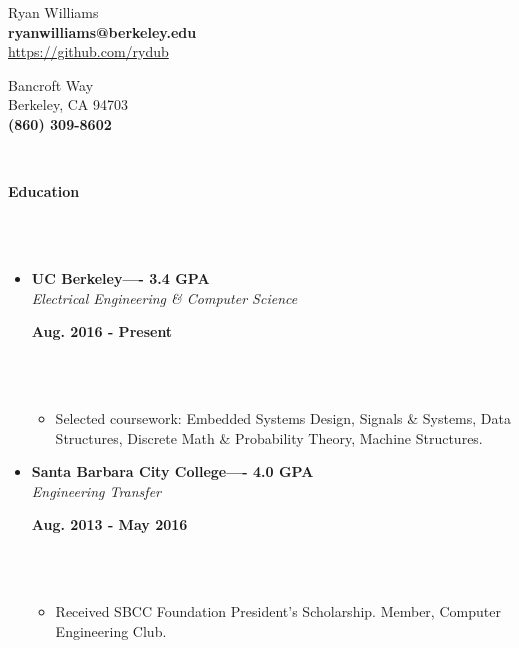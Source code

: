 \documentclass[a4paper,11pt]{article}
\newcommand{\isep}{-2 pt}
\newcommand{\lsep}{-0.2cm}
\newcommand{\resheading}[1]{{\small \colorbox{mygrey}{\begin{minipage}{0.975\textwidth}{\textbf{#1 \vphantom{p\^{E}}}}\end{minipage}}}}
\newcommand{\workexp}[4]{
\begin{minipage}[t]{7cm}
\begin{flushleft}
\textbf{#1} \\
\indent \emph{#2}\\
\end{flushleft}
\end{minipage}
\hfill
\begin{minipage}[t]{7cm}
\begin{flushright}
\textbf{#3} \\
\indent #4 \\
\end{flushright}
\end{minipage}
}
\begin{document}

\begin{minipage}[t]{7cm}
\begin{flushleft}
\large{Ryan Williams} \\
\indent \textbf{ryanwilliams@berkeley.edu} \\
\indent \url{https://github.com/rydub}\\
\end{flushleft}
\end{minipage}
\hfill
\begin{minipage}[t]{7cm}
\begin{flushright}
\large {} Bancroft Way \\
\indent Berkeley, CA 94703 \\
\indent \textbf{(860) 309-8602} \\[\lsep]
\end{flushright}
\end{minipage}
\\[0.2cm]


\resheading{\textbf{Education} }\\[\lsep]
\\[-0.5cm]
\begin{itemize}
\item 
\workexp{UC Berkeley---- 3.4 GPA}{Electrical Engineering \& Computer Science}{Aug. 2016 - Present}{}
\\[-0.3cm]
	\begin{itemize}\itemsep \isep
	\item Selected coursework: Embedded Systems Design, Signals \& Systems, Data Structures, Discrete Math \& Probability Theory, Machine Structures.
	\end{itemize}
\end{itemize}
\begin{itemize}
\item 
\workexp{Santa Barbara City College---- 4.0 GPA}{Engineering Transfer}{Aug. 2013 - May 2016}{}
\\[-0.3cm]
	\begin{itemize}\itemsep \isep
	\item Received SBCC Foundation President's Scholarship. Member, Computer Engineering Club.
	\end{itemize}
\end{itemize}
\end{document}
